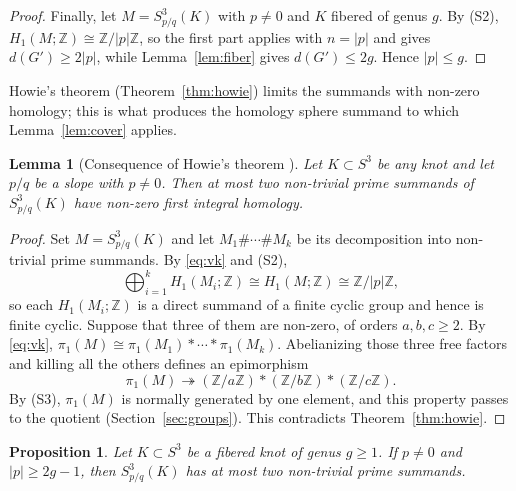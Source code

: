 \documentclass[11pt]{article}
\newcommand{\Z}{\mathbb Z}
\newcommand{\Surg}[2]{S^3_{#1}(#2)}
\newcommand{\rk}{d}
\newtheorem{lemma}[theorem]{Lemma}
\newtheorem{proposition}[theorem]{Proposition}
\theoremstyle{definition}
\theoremstyle{remark}
\begin{document}
\begin{proof}
Finally, let \(M=\Surg{p/q}{K}\) with \(p\neq0\) and \(K\) fibered of
genus \(g\). By (S2), \(H_1(M;\Z)\cong\Z/|p|\Z\), so the first part applies
with \(n=|p|\) and gives \(\rk(G')\geq2|p|\), while
Lemma~\ref{lem:fiber} gives \(\rk(G')\leq2g\). Hence \(|p|\leq g\).
\end{proof}

Howie's theorem (Theorem~\ref{thm:howie}) limits the summands with
non-zero homology; this is what produces the homology sphere summand to
which Lemma~\ref{lem:cover} applies.

\begin{lemma}[Consequence of Howie's theorem {\cite{Howie2002}}]\label{lem:howie}
Let \(K\subset S^3\) be any knot and let \(p/q\) be a slope with
\(p\neq0\). Then at most two non-trivial prime summands of
\(\Surg{p/q}{K}\) have non-zero first integral homology.
\end{lemma}

\begin{proof}
Set \(M=\Surg{p/q}{K}\) and let \(M_1\#\cdots\#M_k\) be its decomposition
into non-trivial prime summands. By \eqref{eq:vk} and (S2),
\[
 \bigoplus_{i=1}^k H_1(M_i;\Z)\cong H_1(M;\Z)\cong\Z/|p|\Z,
\]
so each \(H_1(M_i;\Z)\) is a direct summand of a finite cyclic group and
hence is finite cyclic. Suppose that three of them are non-zero, of
orders \(a,b,c\geq2\). By \eqref{eq:vk},
\(\pi_1(M)\cong\pi_1(M_1)*\cdots*\pi_1(M_k)\). Abelianizing those three
free factors and killing all the others defines an epimorphism
\[
 \pi_1(M)\twoheadrightarrow(\Z/a\Z)*(\Z/b\Z)*(\Z/c\Z).
\]
By (S3), \(\pi_1(M)\) is normally generated by one element, and this
property passes to the quotient (Section~\ref{sec:groups}). This
contradicts Theorem~\ref{thm:howie}.
\end{proof}

\begin{proposition}\label{prop:large}
Let \(K\subset S^3\) be a fibered knot of genus \(g\geq1\). If
\(p\neq0\) and \(|p|\geq2g-1\), then \(\Surg{p/q}{K}\) has at most two
non-trivial prime summands.
\end{proposition}
\end{document}
